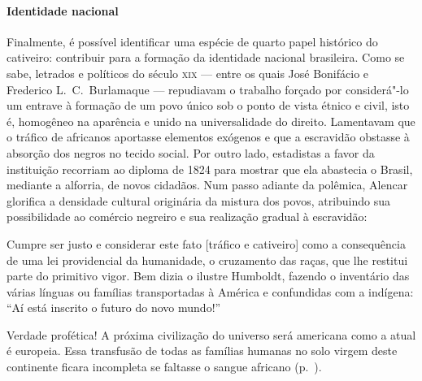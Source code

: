 \paragraph{Identidade nacional} Finalmente, é possível identificar uma espécie de quarto papel histórico
do cativeiro: contribuir para a formação da identidade nacional
brasileira. Como se sabe, letrados e políticos do século \textsc{xix} --- entre os
quais José Bonifácio e Frederico L.~C.~Burlamaque --- repudiavam o
trabalho forçado por considerá"-lo um entrave à  formação de um povo
único sob o ponto de vista étnico e civil, isto é, homogêneo na
aparência e unido na universalidade do direito. Lamentavam que o
tráfico de africanos aportasse elementos exógenos e que a escravidão
obstasse à  absorção dos negros no tecido social. Por outro lado,
estadistas a favor da instituição recorriam ao diploma de 1824 para
mostrar que ela abastecia o Brasil, mediante a alforria, de novos
cidadãos. Num passo adiante da polêmica, Alencar glorifica a densidade
cultural originária da mistura dos povos, atribuindo sua possibilidade
ao comércio negreiro e sua realização gradual à  escravidão: 

\begin{hedraquote}
Cumpre ser justo e considerar este fato [tráfico e cativeiro] como a
consequência de uma lei providencial da humanidade, o cruzamento das
raças, que lhe restitui parte do primitivo vigor. Bem dizia o ilustre
Humboldt, fazendo o inventário das várias línguas ou famílias
transportadas à  América e confundidas com a indígena: ``Aí está inscrito
o futuro do novo mundo!''

Verdade profética! A próxima civilização do universo será americana como
a atual é europeia. Essa transfusão de todas as famílias humanas no
solo virgem deste continente ficara incompleta se faltasse o sangue
africano (p.~\pageref{profetica}).
\end{hedraquote}


